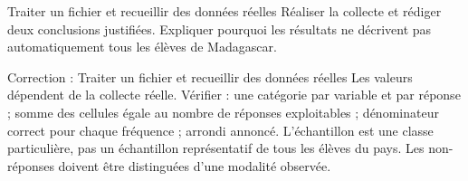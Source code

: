 \documentclass[aspectratio=169,10pt]{beamer}
\begin{document}
\begin{frame}{Traiter un fichier et recueillir des données réelles}
Réaliser la collecte et rédiger deux conclusions justifiées. Expliquer pourquoi les résultats ne décrivent pas automatiquement tous les élèves de Madagascar.
\end{frame}
\begin{frame}{Correction : Traiter un fichier et recueillir des données réelles}
Les valeurs dépendent de la collecte réelle. Vérifier : une catégorie par variable et par réponse ; somme des cellules égale au nombre de réponses exploitables ; dénominateur correct pour chaque fréquence ; arrondi annoncé. L'échantillon est une classe particulière, pas un échantillon représentatif de tous les élèves du pays. Les non-réponses doivent être distinguées d'une modalité observée.
\end{frame}
\end{document}
